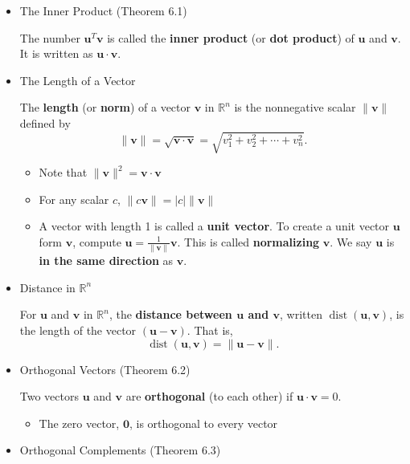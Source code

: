 \documentclass[10pt]{book}
\newenvironment{boxdef}{\begin{mdframed}[backgroundcolor=gray!30,linewidth=0pt,nobreak=true]}{\end{mdframed}}
\newcommand{\R}{\mathbb{R}}
\newcommand{\vect}[1]{\ensuremath{\boldsymbol{\mathbf{#1}}}}
\DeclareMathOperator{\dist}{dist}
\begin{document}
\begin{itemize}
	\item The Inner Product (Theorem 6.1)
	\begin{boxdef}
		The number $\vect{u}^T\vect{v}$ is called the \textbf{inner product} (or \textbf{dot product}) of $\vect{u}$ and $\vect{v}$. It is written as $\vect{u}\cdot\vect{v}$.
	\end{boxdef}
	\item The Length of a Vector
	\begin{boxdef}
		The \textbf{length} (or \textbf{norm}) of a vector $\vect{v}$ in $\R^n$ is the nonnegative scalar $\|\vect{v}\|$ defined by
		$$ \|\vect{v}\| = \sqrt{\vect{v}\cdot\vect{v}} = \sqrt{v_1^2+v_2^2+\cdots+v_n^2}. $$
	\end{boxdef}
	\begin{itemize}
		\item Note that $\|\vect{v}\|^2 = \vect{v}\cdot\vect{v}$
		\item For any scalar $c$, $\|c\vect{v}\| = |c|\|\vect{v}\|$
		\item A vector with length 1 is called a \textbf{unit vector}. To create a unit vector $\vect{u}$ form $\vect{v}$, compute $\vect{u}=\frac{1}{\|\vect{v}\|}\vect{v}$. This is called \textbf{normalizing} $\vect{v}$. We say $\vect{u}$ is \textbf{in the same direction} as $\vect{v}$.
	\end{itemize}
	\item Distance in $\R^n$
		\begin{boxdef}
			For $\vect{u}$ and $\vect{v}$ in $\R^n$, the \textbf{distance between $\boldsymbol{\vect{u}}$ and $\boldsymbol{\vect{v}}$}, written $\dist(\vect{u},\vect{v})$, is the length of the vector $(\vect{u}-\vect{v})$. That is,
			\vspace{-1em}
			$$ \dist(\vect{u},\vect{v}) = \| \vect{u}-\vect{v} \|. $$
		\end{boxdef}
	\item Orthogonal Vectors (Theorem 6.2)
		\begin{boxdef}
			Two vectors $\vect{u}$ and $\vect{v}$ are \textbf{orthogonal} (to each other) if $\vect{u}\cdot\vect{v}=0$.
		\end{boxdef}
		\begin{itemize}
			\item The zero vector, $\vect{0}$, is orthogonal to every vector
		\end{itemize}
	\item Orthogonal Complements (Theorem 6.3)
		\begin{boxdef}

\end{boxdef}
\end{itemize}
\end{document}
